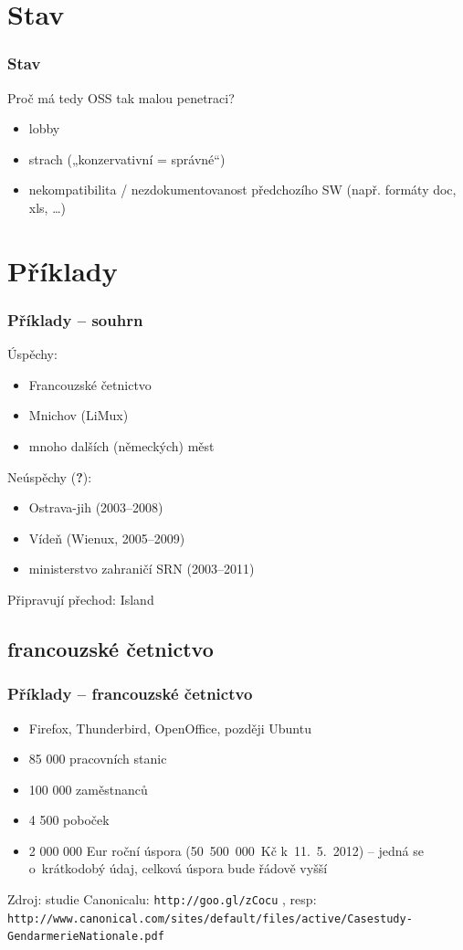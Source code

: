\documentclass[12pt]{beamer}
\begin{document}
\section{Stav}
\begin{frame}
 \frametitle{Stav}

Proč má tedy OSS tak malou penetraci?

\begin{itemize}
 \item lobby
 \item strach („konzervativní = správné“)
 \item nekompatibilita / nezdokumentovanost předchozího SW (např. formáty doc, xls, \ldots{})
\end{itemize}
\end{frame}

\section{Příklady}

\begin{frame}
  \frametitle{Příklady -- souhrn}
  Úspěchy:
  \begin{itemize}
   \item Francouzské četnictvo 
   \item Mnichov (LiMux)
   \item mnoho dalších (německých) měst
  \end{itemize}
  Neúspěchy (\textbf{?}): 
  \begin{itemize}
   \item Ostrava-jih (2003--2008)
   \item Vídeň (Wienux, 2005--2009)
   \item ministerstvo zahraničí SRN (2003--2011)
  \end{itemize}
  Připravují přechod: Island
\end{frame}

\subsection{francouzské četnictvo}
\begin{frame}
 \frametitle{Příklady -- francouzské četnictvo}
 \begin{itemize}
  \item Firefox, Thunderbird, OpenOffice, později Ubuntu
  \item 85 000 pracovních stanic
  \item 100 000 zaměstnanců
  \item 4 500 poboček
  \item 2 000 000 Eur roční úspora (50~500~000~Kč k~11.~5.~2012) -- jedná se o~krátkodobý údaj, celková úspora bude řádově vyšší
 \end{itemize}

Zdroj: studie Canonicalu: \texttt{\scriptsize{http://goo.gl/zCocu}} , resp: \texttt{\scriptsize{http://www.canonical.com/sites/default/files/active/Casestudy-GendarmerieNationale.pdf}}
\end{frame}
\end{document}
